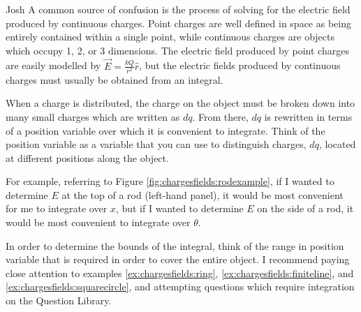 \begin{studentOpinion}{Josh}
A common source of confusion is the process of solving for the electric field produced by continuous charges. Point charges are well defined in space as being entirely contained within a single point, while continuous charges are objects which occupy 1, 2, or 3 dimensions. The electric field produced by point charges are easily modelled by $\vec E = \frac{kQ}{r^2}\hat r$, but the electric fields produced by continuous charges must usually be obtained from an integral.
	
When a charge is distributed, the charge on the object must be broken down into many small charges which are written as $dq$. From there, $dq$ is rewritten in terms of a position variable over which it is convenient to integrate. Think of the position variable as a variable that you can use to distinguish charges, $dq$, located at different positions along the object.

For example, referring to Figure \ref{fig:chargesfields:rodexample}, if I wanted to determine $E$ at the top of a rod (left-hand panel), it would be most convenient for me to integrate over $x$, but if I wanted to determine $E$ on the side of a rod, it would be most convenient to integrate over $\theta$.
	
In order to determine the bounds of the integral, think of the range in position variable that is required in order to cover the entire object. I recommend paying close attention to examples \ref{ex:chargesfields:ring}, \ref{ex:chargesfields:finiteline}, and \ref{ex:chargesfields:squarecircle}, and attempting questions which require integration on the Question Library.
\end{studentOpinion}

